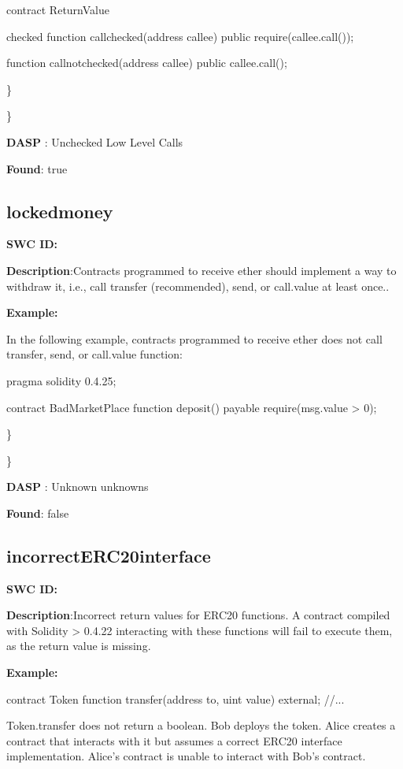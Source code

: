 \documentclass{article}
\begin{document}
contract ReturnValue {

checked
function callchecked(address callee) public {
    require(callee.call());
  }

  function callnotchecked(address callee) public {
    callee.call();
  }
}

\} 

\} 

\textbf{DASP} : Unchecked Low Level Calls

\textbf{Found}: true

\subsection{locked\textunderscore money} 
\textbf{SWC \textunderscore ID:} 

\textbf{Description}:Contracts programmed to receive ether should implement a way to withdraw it, i.e., call transfer (recommended), send, or call.value at least once..


\textbf{Example:} 

In the following example, contracts programmed to receive ether does not call transfer, send, or call.value function:

pragma solidity 0.4.25;

contract BadMarketPlace {
    function deposit() payable {
        require(msg.value > 0);
    }
}

\} 

\} 

\textbf{DASP} : Unknown unknowns

\textbf{Found}: false

\subsection{incorrect\textunderscore ERC20\textunderscore interface} 
\textbf{SWC \textunderscore ID:} 

\textbf{Description}:Incorrect return values for ERC20 functions. A contract compiled with Solidity > 0.4.22 interacting with these functions will fail to execute them, as the return value is missing.


\textbf{Example:} 

contract Token{
    function transfer(address to, uint value) external;
    //...
}

Token.transfer does not return a boolean. Bob deploys the token. Alice creates a contract that interacts with it but assumes a correct ERC20 interface implementation. Alice's contract is unable to interact with Bob's contract.
\end{document}
